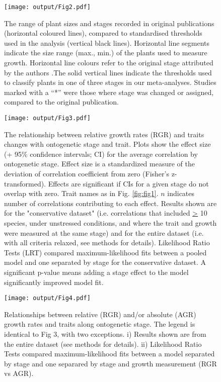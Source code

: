 \documentclass[a4paper,11pt]{article}
\begin{document}
\begin{figure}[h!]
\centering
\texttt{[image: output/Fig2.pdf]}
\caption{The range of plant sizes and stages recorded in original publications (horizontal coloured lines), compared to standardised thresholds used in the analysis (vertical black lines). Horizontal line segments indicate the size range (max., min.) of the plants used to measure growth. Horizontal line colours refer to the original stage attributed by the authors .The solid vertical lines indicate the thresholds used to classify plants in one of three stages in our meta-analyses. Studies marked with a ``*'' were those where stage was changed or assigned, compared to the original publication.}
\label{fig:fig2}
\end{figure}



\begin{figure}[h!]
\centering
\texttt{[image: output/Fig3.pdf]}
\caption{The relationship between relative growth rates (RGR) and traits changes with ontogenetic stage and trait. Plots show the effect size (+ 95\% confidence intervals; CI) for the average correlation by ontogenetic stage. Effect size is a standardized measure of the deviation of correlation coefficient from zero (Fisher's z-transformed). Effects are significant if CIs for a given stage do not overlap with zero. Trait names as in Fig. \ref{fig:fig1}. $n$ indicates number of correlations contributing to each effect. Results shown are for the "conservative dataset" (i.e. correlations that included \underline{\textgreater} 10 species, under unstressed conditions, and where the trait and growth were measured at the same stage) and for the entire dataset (i.e. with all criteria relaxed, see methods for details). Likelihood Ratio Tests (LRT) compared maximum-likelihood fits between a pooled model and one separated by stage for the conservative dataset. A significant p-value means adding a stage effect to the model significantly improved model fit.}
\label{fig:fig3}
\end{figure}


\begin{figure}[h!]
\centering
\texttt{[image: output/Fig4.pdf]}
\caption{Relationships between relative (RGR) and/or absolute (AGR) growth rates and traits along ontogenetic stage. The legend is identical to Fig 3, with two exceptions. i) Results shown are from the entire dataset (see methods for details). ii) Likelihood Ratio Tests compared maximum-likelihood fits between a model separated by stage and one separared by stage and growth measurement (RGR vs AGR).}
\label{fig:fig4}
\end{figure}
\end{document}
